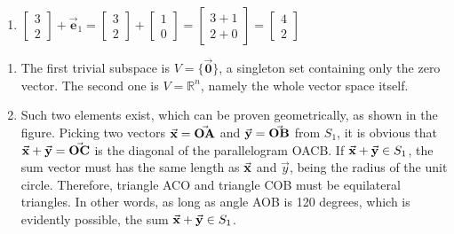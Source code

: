 \begin{exercise}{1}
\begin{enumerate}
  \item $\begin{bmatrix}3\\2\end{bmatrix} + \vec{\mathbf{e}}_1 =
         \begin{bmatrix}3\\2\end{bmatrix} +
         \begin{bmatrix}1\\0\end{bmatrix} =
         \begin{bmatrix}3+1\\2+0\end{bmatrix}=
         \begin{bmatrix}4\\2\end{bmatrix}$
  \end{enumerate}
\end{exercise}

\begin{exercise}{4}
  \begin{enumerate}
    \item The first trivial subspace is $V = \{\vec{\mathbf{0}}\}$, a singleton set containing only the zero       vector. The second one is $V = \mathbb{R}^n$, namely the whole vector space itself.
    
    \item Such two elements exist, which can be proven geometrically, as shown in the figure. Picking two vectors $\vec{\mathbf{x}} = \vec{\mathbf{OA}}$ and $\vec{\mathbf{y}} = \vec{\mathbf{OB}}$ from $S_1$, it is obvious that $\vec{\mathbf{x}} + \vec{\mathbf{y}} = \vec{\mathbf{OC}}$ is the diagonal of the parallelogram OACB. If $\vec{\mathbf{x}} + \vec{\mathbf{y}} \in S_1$, the sum vector must has the same length as $\vec{\mathbf{x}}$ and $\vec{y}$, being the radius of the unit circle. Therefore, triangle ACO and triangle COB must be equilateral triangles. In other words, as long as angle AOB is 120 degrees, which is evidently possible, the sum $\vec{\mathbf{x}} + \vec{\mathbf{y}} \in S_1$. \QED

    \begin{figure}[h]
      \begin{center}
      \end{center}
    \end{figure}
  \end{enumerate}
\end{exercise}

